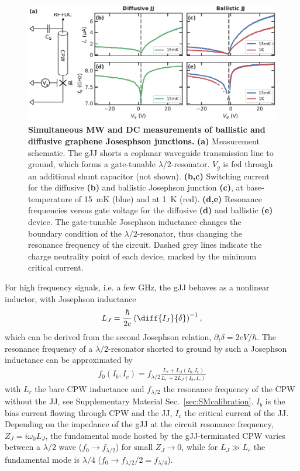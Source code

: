 \begin{figure}[t]
	\centering
	\includegraphics[width=\linewidth]{chapter-gJJ-CPR/figs/Figure1}
	\caption{
		\textbf{Simultaneous MW and DC measurements of ballistic and diffusive graphene Josesphson junctions.}
		\textbf{(a)} Measurement schematic.
		The gJJ shorts a coplanar waveguide transmission line to ground, which forms a gate-tunable $\lambda/2$-resonator.
		$V_g$ is fed through an additional shunt capacitor (not shown).
		\textbf{(b,c)} Switching current for the diffusive \textbf{(b)} and ballistic Josephson junction \textbf{(c)}, at base-temperature of \SI{15}{\milli\kelvin} (blue) and at \SI{1}{\kelvin} (red).
		\textbf{(d,e)} Resonance frequencies versus gate voltage for the diffusive \textbf{(d)} and ballistic \textbf{(e)} device.
		The gate-tunable Josephson inductance changes the boundary condition of the $\lambda/2$-resonator, thus changing the resonance frequency of the circuit.
		Dashed grey lines indicate the charge neutrality point of each device, marked by the minimum critical current.
	}
	\label{fig:figure1}
\end{figure}

For high frequency signals, i.e. a few \si{\giga\hertz}, the gJJ behaves as a nonlinear inductor, with Josephson inductance
%
\begin{align}
L_J = \frac{\hbar}{2e}\left(\diff{I_J}{\delta}\right)^{-1},
\label{eq:LJgeneral}
\end{align}
%
which can be derived from the second Josephson relation, $\partial_t\delta=2e V/\hbar$.
%
The resonance frequency of a $\lambda/2$-resonator shorted to ground by such a Josephson inductance can be approximated by
\begin{align}
f_0\left(I_b,I_c\right) = f_{\lambda/2} \frac{L_r+L_J\left(I_b, I_c\right)}{L_r +  2L_J\left(I_b, I_c\right)}
\label{eq:Pogorzalek}
\end{align}
%
with $L_r$ the bare CPW inductance and $f_{\lambda/2}$ the resonance frequency of the CPW without the JJ, see Supplementary Material Sec.~\ref{sec:SMcalibration}.
%
$I_b$ is the bias current flowing through CPW and the JJ, $I_c$ the critical current of the JJ.
%
Depending on the impedance of the gJJ at the circuit resonance frequency, $Z_J=i\omega_0 L_J$, the fundamental mode hosted by the gJJ-terminated CPW varies between a $\lambda/2$ wave ($f_0\rightarrow f_{\lambda/2}$) for small $Z_J\rightarrow0$, while for $L_J\gg L_r$ the fundamental mode is $\lambda/4$ ($f_0 \rightarrow f_{\lambda/2}/2=f_{\lambda/4}$).

